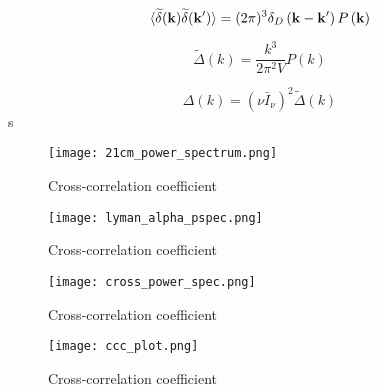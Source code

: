 \begin{equation}
\langle \widetilde{\delta} ({\bf k}) \widetilde{\delta} ({\bf k'}) \rangle = (2 \pi) ^3 \delta_D \left( {\bf k} - {\bf k'} \right) P \left({\bf k} \right)
\end{equation}

\begin{equation}
    \widetilde{\Delta} \left( k \right) = \frac{k^3}{2 \pi ^2 V} P \left( k \right)
\end{equation}

\begin{equation}
    \Delta \left( k \right) = \left( \nu \bar{I}_{\nu} \right)^2 \widetilde{\Delta} \left( k \right)
\end{equation}s

\begin{figure}[ht]
	\centering
	\texttt{[image: 21cm\_power\_spectrum.png]}
	\caption[21cm Power Spectrum]{Cross-correlation coefficient}
	\label{fig:21cm_ps}
\end{figure}

\begin{figure}[ht]
	\centering
	\texttt{[image: lyman\_alpha\_pspec.png]}
	\caption[Ly$\alpha$ Power Spectrum]{Cross-correlation coefficient}
	\label{fig:lya_ps}
\end{figure}

\begin{figure}[ht]
	\centering
	\texttt{[image: cross\_power\_spec.png]}
	\caption[Cross-Power Spectrum]{Cross-correlation coefficient}
	\label{fig:x_ps}
\end{figure}

\begin{figure}[ht]
	\centering
	\texttt{[image: ccc\_plot.png]}
	\caption[Cross-Correlation Coefficient]{Cross-correlation coefficient}
	\label{fig:ccc}
\end{figure}
